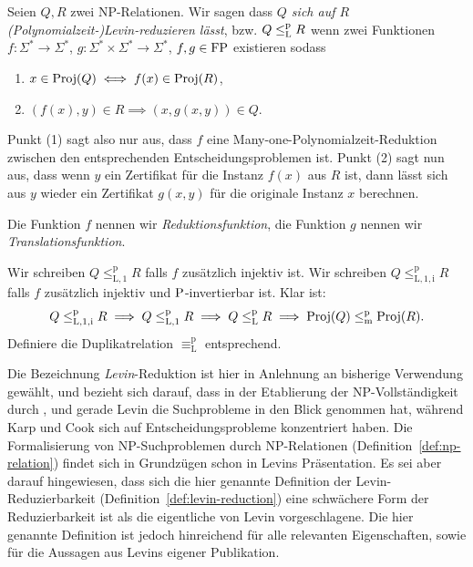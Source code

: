 \begin{definition}\label{def:levin-reduction}
    Seien $Q, R$ zwei NP-Relationen. Wir sagen dass \emph{$Q$ sich auf $R$ (Polynomialzeit-)Levin-reduzieren lässt}, bzw. $Q\leqlp R$ wenn zwei Funktionen $f:\Sigma^*\to\Sigma^*$, $g:\Sigma^*\times\Sigma^*\to\Sigma^*$, $f, g\in \FP$ existieren sodass
    \begin{enumerate}
        \item $x\in\Proj(Q) \iff f(x)\in\Proj(R)$,
        \item $(f(x), y)\in R \implies (x, g(x,y))\in Q$.
    \end{enumerate}
    Punkt (1) sagt also nur aus, dass $f$ eine Many-one-Polynomialzeit-Reduktion zwischen den entsprechenden Entscheidungsproblemen ist.
    Punkt (2) sagt nun aus, dass wenn $y$ ein Zertifikat für die Instanz $f(x)$ aus $R$ ist, dann lässt sich aus $y$ wieder ein Zertifikat $g(x,y)$ für die originale Instanz $x$ berechnen.

    Die Funktion $f$ nennen wir \emph{Reduktionsfunktion}, die Funktion $g$ nennen wir \emph{Translationsfunktion}.

    Wir schreiben $Q\leq_\mathrm{L,1}^\mathrm p R$ falls $f$ zusätzlich injektiv ist. Wir schreiben $Q\leq_\mathrm{L,1,i}^\mathrm p R$ falls $f$ zusätzlich injektiv und $\P$-invertierbar ist. Klar ist:
    \[ Q\leq_\mathrm{L,1,i}^\mathrm p R \implies Q \leq_\mathrm{L,1}^\mathrm p R \implies Q \leqlp R \implies \Proj(Q) \leqmp \Proj(R).\]
    Definiere die Duplikatrelation $\equiv_\mathrm L^\mathrm p$ entsprechend.
\end{definition}
Die Bezeichnung \emph{Levin}-Reduktion ist hier in Anlehnung an bisherige Verwendung gewählt, und bezieht sich darauf, dass in der Etablierung der NP-Vollständigkeit durch \textcite{karp_reducibility_1972}, \textcite{cook_complexity_1971} und \textcite{levin_universal_1973} gerade Levin die Suchprobleme in den Blick genommen hat, während Karp und Cook sich auf Entscheidungsprobleme konzentriert haben. Die Formalisierung von NP-Suchproblemen durch NP-Relationen (Definition~\ref{def:np-relation}) findet sich in Grundzügen schon in Levins Präsentation. Es sei aber darauf hingewiesen, dass sich die hier genannte Definition der Levin-Reduzierbarkeit (Definition~\ref{def:levin-reduction}) eine schwächere Form der Reduzierbarkeit ist als die eigentliche von Levin vorgeschlagene. Die hier genannte Definition ist jedoch hinreichend für alle relevanten Eigenschaften, sowie für die Aussagen aus Levins eigener Publikation.


